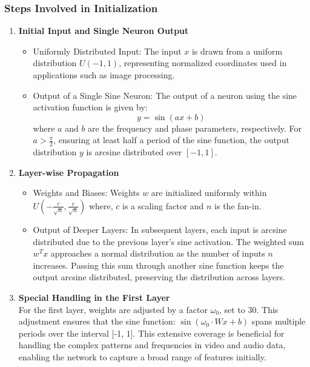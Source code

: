 \documentclass{ioereport}
\begin{document}
    \subsubsection{Steps Involved in Initialization}
    \begin{enumerate}[label=\textbf{\roman*.}]
        \item \textbf{Initial Input and Single Neuron Output}
        \begin{itemize}
            \item Uniformly Distributed Input: The input $x$ is drawn from a uniform distribution $U(-1, 1)$, representing normalized coordinates used in applications such as image processing.
            \item Output of a Single Sine Neuron: The output of a neuron using the sine activation function is given by:
               \begin{equation}
                  y = \sin(ax + b) 
               \end{equation} 
            where $a$ and $b$ are the frequency and phase parameters, respectively. For $a > \frac{\pi}{2}$, ensuring at least half a period of the sine function, the output distribution $y$ is arcsine distributed over $[-1, 1]$.
        \end{itemize}
        \item \textbf{Layer-wise Propagation}
        \begin{itemize}
            \item Weights and Biases: Weights $w$ are initialized uniformly within $U\left(-\frac{c}{\sqrt{n}}, \frac{c}{\sqrt{n}}\right)$ where, $c$ is a scaling factor and $n$ is the fan-in.
            \item Output of Deeper Layers: In subsequent layers, each input is arcsine distributed due to the previous layer's sine activation. The weighted sum $w^T x$ approaches a normal distribution as the number of inputs $n$ increases. Passing this sum through another sine function keeps the output arcsine distributed, preserving the distribution across layers.
        \end{itemize}
        \item \textbf{Special Handling in the First Layer} \\
          For the first layer, weights are adjusted by a factor $\omega_0$, set to 30. This adjustment ensures that the sine function: $\sin(\omega_0 \cdot Wx + b)$ spans multiple periods over the interval [-1, 1]. This extensive coverage is beneficial for handling the complex patterns and frequencies in video and audio data, enabling the network to capture a broad range of features initially.        
    \end{enumerate}
\end{document}

